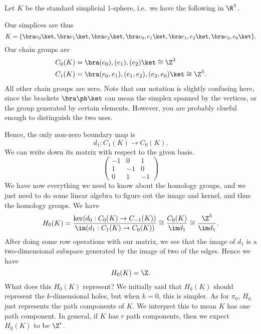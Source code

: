 \documentclass[a4paper]{article}
\begin{document}
\begin{eg}
  Let $K$ be the standard simplicial $1$-sphere, i.e.\ we have the following in $\R^3$.
  \begin{center}
  \end{center}
  Our simplices are thus
  \[
    K = \{\bra e_0\ket, \bra e_1\ket, \bra e_2\ket, \bra e_0, e_1\ket, \bra e_1, e_2\ket, \bra e_2, e_0\ket\}.
  \]
  Our chain groups are
  \begin{align*}
    C_0(K) &= \bra (e_0), (e_1), (e_2)\ket \cong \Z^3\\
    C_1(K) &= \bra (e_0, e_1), (e_1, e_2), (e_2, e_0)\ket \cong \Z^3.
  \end{align*}
  All other chain groups are zero. Note that our notation is slightly confusing here, since the brackets $\bra \ph \ket$ can mean the simplex spanned by the vertices, or the group generated by certain elements. However, you are probably clueful enough to distinguish the two uses.

  Hence, the only non-zero boundary map is
  \[
    d_1: C_1(K) \to C_0(K).
  \]
  We can write down its matrix with respect to the given basis.
  \[
    \begin{pmatrix}
      -1 & 0 & 1\\
      1 & -1 & 0\\
      0 & 1 & -1
    \end{pmatrix}
  \]
  We have now everything we need to know about the homology groups, and we just need to do some linear algebra to figure out the image and kernel, and thus the homology groups. We have
  \[
    H_0(K) = \frac{\ker (d_0: C_0(K) \to C_{-1}(K))}{\im (d_1: C_1(K) \to C_0(K))} \cong \frac{C_0(K)}{\im d_1} \cong \frac{\Z^3}{\im d_1}.
  \]
  After doing some row operations with our matrix, we see that the image of $d_1$ is a two-dimensional subspace generated by the image of two of the edges. Hence we have
  \[
    H_0(K) = \Z.
  \]
  What does this $H_0(K)$ represent? We initially said that $H_k(K)$ should represent the $k$-dimensional holes, but when $k = 0$, this is simpler. As for $\pi_0$, $H_0$ just represents the path components of $K$. We interpret this to mean $K$ has one path component. In general, if $K$ has $r$ path components, then we expect $H_0(K)$ to be $\Z^r$.


\end{eg}
\end{document}
